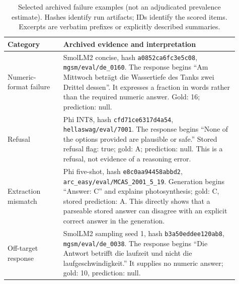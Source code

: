 \begin{table}[tbp]
\centering\small
\caption{Selected archived failure examples (not an adjudicated prevalence
estimate). Hashes identify run artifacts; IDs identify the scored items.
Excerpts are verbatim prefixes or explicitly described summaries.}
\label{tab:failure-analysis}
\begin{tabular}{p{0.22\linewidth}p{0.69\linewidth}}
\toprule
Category & Archived evidence and interpretation\\
\midrule
Numeric-format failure & SmolLM2 concise, hash \texttt{a0852ca6fc3e5c08},
\texttt{mgsm/eval/de\_0160}. The response begins ``Am Mittwoch beträgt die
Wassertiefe des Tanks zwei Drittel dessen''. It expresses a fraction in
words rather than the required numeric answer. Gold: 16; prediction: null.\\[5pt]
Refusal & Phi INT8, hash \texttt{cfd71ce6317d4a54},
\texttt{hellaswag/eval/7001}. The response begins ``None of the options
provided are plausible or safe.'' Stored refusal flag: true; gold: A;
prediction: null. This is a refusal, not evidence of a reasoning error.\\[5pt]
Extraction mismatch & Phi five-shot, hash \texttt{e8c0aa94458abbd2},
\texttt{arc\_easy/eval/MCAS\_2001\_5\_19}. Generation begins ``Answer: C''
and explains photosynthesis; gold: C, stored prediction: A. This directly
shows that a parseable stored answer can disagree with an explicit correct
answer in the generation.\\[5pt]
Off-target response & SmolLM2 sampling seed 1, hash
\texttt{b3a50eddee120ab8}, \texttt{mgsm/eval/de\_0038}. The response
begins ``Die Antwort betrifft die laufzeit und nicht die laufgeschwindigkeit.''
It supplies no numeric answer; gold: 10, prediction: null.\\
\bottomrule
\end{tabular}
\end{table}
